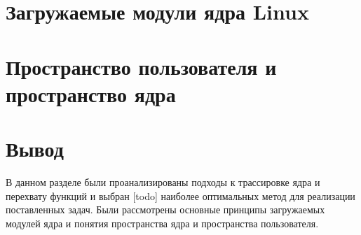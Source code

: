 \section{Загружаемые модули ядра Linux}

\section{Пространство пользователя и пространство ядра}

\section{Вывод}
	В данном разделе были проанализированы подходы к трассировке ядра и перехвату функций и 
	выбран [todo] наиболее оптимальных метод для реализации поставленных задач. 
	Были рассмотрены основные принципы загружаемых модулей ядра и понятия пространства ядра и пространства пользователя.
	
\pagebreak